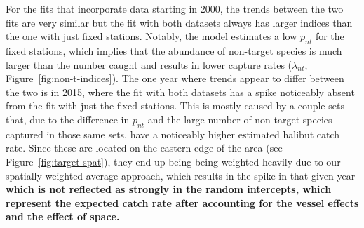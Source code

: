 \documentclass[12pt]{article}\usepackage[]{graphicx}\usepackage[]{color}
\begin{document}
For the fits that incorporate data starting in 2000, the trends between the two fits are very similar but the fit with both datasets always has larger indices than the one with just fixed stations. Notably, the model estimates a low \(p_{nt}\) for the fixed stations, which implies that the abundance of non-target species is much larger than the number caught and results in lower capture rates (\(\lambda_{nt}\), Figure~\ref{fig:non-t-indices}). The one year where trends appear to differ between the two is in 2015, where the fit with both datasets has a spike noticeably absent from the fit with just the fixed stations. This is mostly caused by a couple sets that, due to the difference in \(p_{nt}\) and the large number of non-target species captured in those same sets, have a noticeably higher estimated halibut catch rate. Since these are located on the eastern edge of the area (see Figure~\ref{fig:target-spat}), they end up being being weighted heavily due to our spatially weighted average approach, which results in the spike in that given year \textbf{which is not reflected as strongly in the random intercepts, which represent the expected catch rate after accounting for the vessel effects and the effect of space.}
\end{document}
